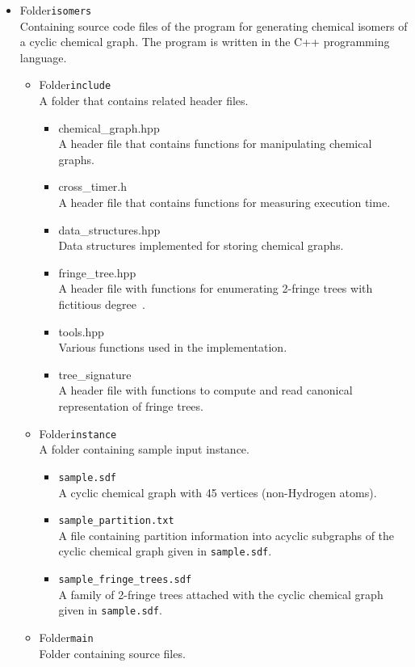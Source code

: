 \documentclass[11pt,titlepage,dvipdfmx,twoside]{article}
\begin{document}
%
\begin{itemize}
\item Folder{\tt isomers}\\
	Containing source code files of the program for generating chemical isomers of a cyclic chemical graph.
	The program is written in the C++ programming language.
	\begin{itemize}
	\item Folder{\tt include}\\
		A folder that contains related header files.
		\begin{itemize}
			\item{chemical\_graph.hpp}\\
			  A header file that contains functions for manipulating 
			  chemical graphs.
			\item{cross\_timer.h}\\
				A header file that contains functions for 
				measuring execution time.
				
			\item{data\_structures.hpp}\\
				Data structures implemented for storing 
				chemical graphs.
				
			\item{fringe\_tree.hpp}\\
				A header file with functions for enumerating 
				2-fringe trees with fictitious degree~\cite{branch}.
				
			\item{tools.hpp}\\
				Various functions used in the implementation.
				
			\item{tree\_signature}\\
				A header file with functions to compute and read canonical representation of fringe trees.
					
		\end{itemize}
	\item Folder{\tt instance}\\
		A folder containing sample input instance.
		\begin{itemize}
			\item{\tt sample.sdf}\\
			  A cyclic chemical graph with 45 vertices 
			  (non-Hydrogen atoms).
			\item{\tt sample\_partition.txt}\\
			  A file containing partition information into acyclic
			   subgraphs 
				of the cyclic chemical graph given in {\tt sample.sdf}.
			\item{\tt sample\_fringe\_trees.sdf}\\
			 	 A family of 2-fringe trees attached with the cyclic 
			 	 chemical graph given in {\tt sample.sdf}.
		\end{itemize}
	\item Folder{\tt main}\\
		Folder containing source files.
		\begin{itemize}
				

\end{itemize}
\end{itemize}
\end{itemize}
\end{document}

